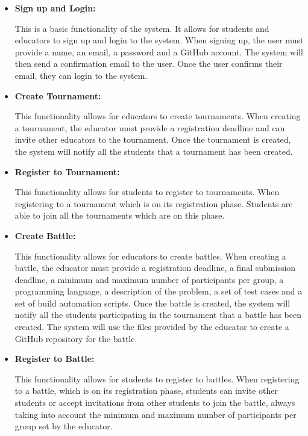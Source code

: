 \documentclass{article}
\begin{document}
\begin{itemize}
    \item \textbf{Sign up and Login:}
    
    This is a basic functionality of the system. It allows for students and educators to sign up and login to the system.
    When signing up, the user must provide a name, an email, a password and a GitHub account. The system will then send a confirmation email to the user.
    Once the user confirms their email, they can login to the system.

    \item \textbf{Create Tournament:}
    
    This functionality allows for educators to create tournaments. When creating a tournament, the educator
    must provide a registration deadline and can invite other educators to the tournament. Once the tournament
    is created, the system will notify all the students that a tournament has been created. 

    \item \textbf{Register to Tournament:}
    
    This functionality allows for students to register to tournaments. When registering to a tournament which is on 
    its registration phase. Students are able to join all the tournaments which are on this phase.

    \item \textbf{Create Battle:}
    
    This functionality allows for educators to create battles. When creating a battle, the educator
    must provide a registration deadline, a final submission deadline, a minimum and maximum number of participants per group, 
    a programming language, a description of the problem, a set of test cases and a set of build automation scripts. 
    Once the battle is created, the system will notify all the students participating in the tournament that 
    a battle has been created. The system will use the files provided by the educator to create a GitHub repository for the battle.
    
    \item \textbf{Register to Battle:}
    
    This functionality allows for students to register to battles. When registering to a battle, which is on
    its registration phase, students can invite other students or accept invitations from other students to join the battle,
    always taking into account the minimum and maximum number of participants per group set by the educator.


\end{itemize}
\end{document}
